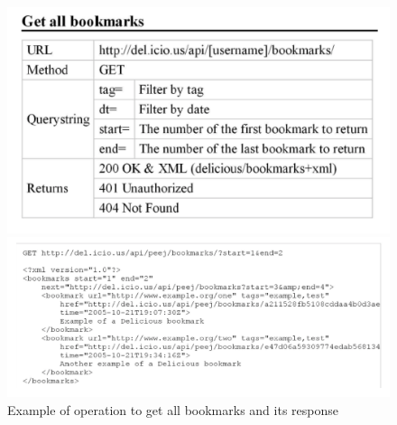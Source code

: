 \documentclass[10pt,a4paper]{article}
\begin{document}
 \begin{figure}[h!]
\begin{minipage}{.5\textwidth}
  \centering
  \includegraphics[width=.9\linewidth]{images/rest-op-ex1}
\end{minipage}%
\begin{minipage}{.5\textwidth}
  \centering
  \includegraphics[width=.9\linewidth]{images/rest-answer-ex1}
\end{minipage}
\caption{Example of operation to get all bookmarks and its response}
\end{figure}
\end{document}

